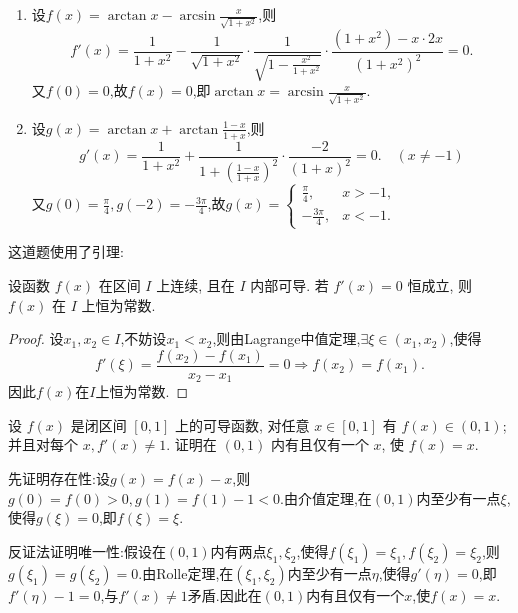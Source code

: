 \begin{solution}
    \begin{enumerate}
        \item 设$f(x) = \arctan x - \arcsin\frac{x}{\sqrt{1+x^2}}$,则
              $$
                  f'(x) = \frac{1}{1+x^2} - \frac{1}{\sqrt{1+x^2}} \cdot \frac{1}{\sqrt{1-\frac{x^2}{1+x^2}}} \cdot \frac{(1+x^2) - x \cdot 2x}{(1+x^2)^2} = 0.
              $$
              又$f(0) = 0$,故$f(x) = 0$,即$\arctan x = \arcsin\frac{x}{\sqrt{1+x^2}}$.
        \item 设$g(x) = \arctan x + \arctan\frac{1-x}{1+x}$,则
              $$
                  g'(x) = \frac{1}{1+x^2} + \frac{1}{1+\left(\frac{1-x}{1+x}\right)^2} \cdot \frac{-2}{(1+x)^2} = 0. \quad (x \ne -1)
              $$
              又$g(0) = \frac{\pi}{4},g(-2) = -\frac{3\pi}{4}$,故$g(x) = \begin{cases} \frac{\pi}{4}, & x > -1, \\ -\frac{3\pi}{4}, & x < -1. \end{cases}$
    \end{enumerate}
\end{solution}

这道题使用了引理:
\begin{lemma*}
    设函数 $f(x)$ 在区间 $I$ 上连续, 且在 $I$ 内部可导. 若 $f'(x)=0$ 恒成立, 则 $f(x)$ 在 $I$ 上恒为常数.
\end{lemma*}

\begin{proof}
    设$x_1,x_2 \in I$,不妨设$x_1 < x_2$,则由Lagrange中值定理,$\exists \xi \in (x_1,x_2)$,使得
    $$
        f'(\xi) = \frac{f(x_2)-f(x_1)}{x_2-x_1} = 0 \Rightarrow f(x_2) = f(x_1).
    $$
    因此$f(x)$在$I$上恒为常数.
\end{proof}

\begin{exercise}[3.3.6]
    设 $f(x)$ 是闭区间 $[0,1]$ 上的可导函数, 对任意 $x \in [0,1]$ 有 $f(x) \in (0,1)$; 并且对每个 $x, f'(x) \ne 1$. 证明在 $(0,1)$ 内有且仅有一个 $x$, 使 $f(x)=x$.
\end{exercise}

\begin{solution}
    先证明存在性:设$g(x) = f(x) - x$,则$g(0) = f(0) > 0, g(1) = f(1) - 1 < 0$.由介值定理,在$(0,1)$内至少有一点$\xi$,使得$g(\xi) = 0$,即$f(\xi) = \xi$.

    反证法证明唯一性:假设在$(0,1)$内有两点$\xi_1,\xi_2$,使得$f(\xi_1) = \xi_1,f(\xi_2) = \xi_2$,则$g(\xi_1) = g(\xi_2) = 0$.由Rolle定理,在$(\xi_1,\xi_2)$内至少有一点$\eta$,使得$g'(\eta) = 0$,即$f'(\eta) - 1 = 0$,与$f'(x) \ne 1$矛盾.因此在$(0,1)$内有且仅有一个$x$,使$f(x) = x$.
\end{solution}

